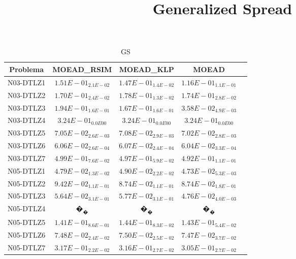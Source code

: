 \documentclass{article}
\title{Generalized Spread}
\author{}
\begin{document}
\maketitle
\begin{table*}[ht!]
\scriptsize
\caption{GS}
\centering\begin{tabular}{|c||c||c||c||c|} \hline
Problema &MOEAD_RSIM &MOEAD_KLP &MOEAD\\\hline
N03-DTLZ1 &$1.51E-01_{2.1E-02}$ &\cellcolor{gray25}$1.47E-01_{1.4E-02}$ &\cellcolor{gray95}$1.16E-01_{1.1E-01}$\\ 
\hline
N03-DTLZ2 &\cellcolor{gray95}$1.70E-01_{2.4E-02}$ &$1.78E-01_{1.3E-02}$ &\cellcolor{gray25}$1.74E-01_{2.8E-02}$\\ 
\hline
N03-DTLZ3 &$1.94E-01_{1.6E-01}$ &\cellcolor{gray25}$1.67E-01_{1.6E-01}$ &\cellcolor{gray95}$3.58E-02_{4.9E-03}$\\ 
\hline
N03-DTLZ4 &\cellcolor{gray95}$3.24E-01_{0.0E00}$ &\cellcolor{gray25}$3.24E-01_{0.0E00}$ &$3.24E-01_{0.0E00}$\\ 
\hline
N03-DTLZ5 &\cellcolor{gray25}$7.05E-02_{2.6E-03}$ &$7.08E-02_{2.9E-03}$ &\cellcolor{gray95}$7.02E-02_{2.8E-03}$\\ 
\hline
N03-DTLZ6 &\cellcolor{gray25}$6.06E-02_{2.6E-04}$ &$6.07E-02_{2.4E-04}$ &\cellcolor{gray95}$6.04E-02_{3.3E-04}$\\ 
\hline
N03-DTLZ7 &$4.99E-01_{7.6E-02}$ &\cellcolor{gray25}$4.97E-01_{5.9E-02}$ &\cellcolor{gray95}$4.92E-01_{1.1E-01}$\\ 
\hline
N05-DTLZ1 &\cellcolor{gray25}$4.79E-02_{1.3E-02}$ &$4.90E-02_{2.2E-02}$ &\cellcolor{gray95}$4.73E-02_{5.3E-03}$\\ 
\hline
N05-DTLZ2 &$9.42E-02_{1.1E-01}$ &\cellcolor{gray95}$8.74E-02_{1.1E-01}$ &\cellcolor{gray25}$8.74E-02_{1.8E-01}$\\ 
\hline
N05-DTLZ3 &\cellcolor{gray25}$5.64E-02_{3.1E-01}$ &$5.77E-02_{3.1E-01}$ &\cellcolor{gray95}$4.76E-02_{4.0E-03}$\\ 
\hline
N05-DTLZ4 &\cellcolor{gray25}$�_{�}$ &$�_{�}$ &$�_{�}$\\ 
\hline
N05-DTLZ5 &\cellcolor{gray95}$1.41E-01_{8.6E-01}$ &$1.44E-01_{8.3E-02}$ &\cellcolor{gray25}$1.43E-01_{5.4E-02}$\\ 
\hline
N05-DTLZ6 &\cellcolor{gray25}$7.48E-02_{2.4E-02}$ &$7.50E-02_{2.5E-02}$ &\cellcolor{gray95}$7.47E-02_{3.7E-02}$\\ 
\hline
N05-DTLZ7 &$3.17E-01_{2.2E-02}$ &\cellcolor{gray25}$3.16E-01_{2.7E-02}$ &\cellcolor{gray95}$3.05E-01_{2.7E-02}$\\ 

\end{tabular}
\end{table*}
\end{document}
